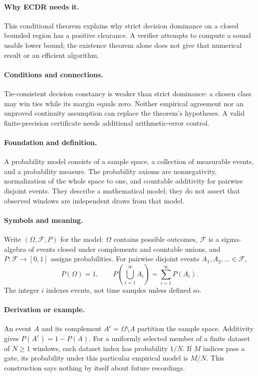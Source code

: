 \paragraph{Why ECDR needs it.}
This conditional theorem explains why strict decision dominance on a
closed bounded region has a positive clearance. A verifier attempts to
compute a sound usable lower bound; the existence theorem alone does
not give that numerical result or an efficient algorithm.
\paragraph{Conditions and connections.}
Tie-consistent decision constancy is weaker than strict dominance: a
chosen class may win ties while its margin equals zero. Neither
empirical agreement nor an unproved continuity assumption can replace
the theorem's hypotheses. A valid finite-precision certificate needs
additional arithmetic-error control.

\paragraph{Foundation and definition.}
A probability model consists of a sample space, a collection of
measurable events, and a probability measure. The probability axioms
are nonnegativity, normalization of the whole space to one, and
countable additivity for pairwise disjoint events. They describe a
mathematical model; they do not assert that observed windows are
independent draws from that model.
\paragraph{Symbols and meaning.}
Write $(\Omega,\mathcal F,P)$ for the model: $\Omega$ contains
possible outcomes, $\mathcal F$ is a sigma-algebra of events closed
under complements and countable unions, and $P:\mathcal F\to[0,1]$
assigns probabilities. For pairwise disjoint events
$A_1,A_2,\ldots\in\mathcal F$,
\[
 P(\Omega)=1,\qquad
 P\!\left(\bigcup_{i=1}^{\infty}A_i\right)
 =\sum_{i=1}^{\infty}P(A_i).
\]
The integer $i$ indexes events, not time samples unless defined so.
\paragraph{Derivation or example.}
An event $A$ and its complement $A^c=\Omega\setminus A$ partition
the sample space. Additivity gives $P(A^c)=1-P(A)$.
For a uniformly selected member of a finite dataset of $N\ge1$
windows, each dataset index has probability $1/N$. If $M$ indices pass
a gate, its probability under this particular empirical model is $M/N$.
This construction says nothing by itself about future recordings.
